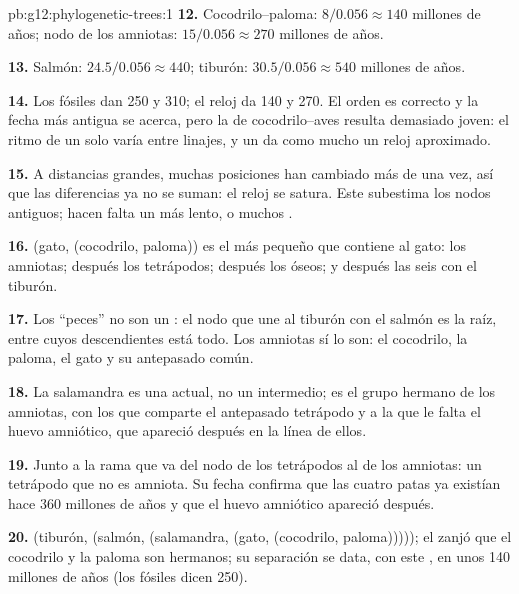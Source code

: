 \begin{solution}{pb:g12:phylogenetic-trees:1}
\textbf{12.} Cocodrilo--paloma: $8/0.056 \approx 140$ millones de años;
nodo de los amniotas: $15/0.056 \approx 270$ millones de años.

\textbf{13.} Salmón: $24.5/0.056 \approx 440$; tiburón:
$30.5/0.056
\approx 540$ millones de años.

\textbf{14.} Los fósiles dan 250 y 310; el reloj da 140 y 270. El orden
es correcto y la fecha más antigua se acerca, pero la de
cocodrilo--aves resulta demasiado joven: el ritmo de un solo  varía
entre linajes, y un  da como mucho un reloj aproximado.

\textbf{15.} A distancias grandes, muchas posiciones han cambiado más
de una vez, así que las diferencias ya no se suman: el reloj se satura.
Este  subestima los nodos antiguos; hacen falta un  más lento, o
muchos .

\textbf{16.} (gato, (cocodrilo, paloma)) es el  más pequeño que
contiene al gato: los amniotas; después los tetrápodos; después los
 óseos; y después las seis con el tiburón.

\textbf{17.} Los ``peces'' no son un : el nodo que une al tiburón
con el salmón es la raíz, entre cuyos descendientes está todo. Los
amniotas sí lo son: el cocodrilo, la paloma, el gato y su antepasado
común.

\textbf{18.} La salamandra es una  actual, no un intermedio; es
el grupo hermano de los amniotas, con los que comparte el antepasado
tetrápodo y a la que le falta el huevo amniótico, que apareció después
en la línea de ellos.

\textbf{19.} Junto a la rama que va del nodo de los tetrápodos al de
los amniotas: un tetrápodo que no es amniota. Su fecha confirma que las
cuatro patas ya existían hace 360 millones de años y que el huevo
amniótico apareció después.

\textbf{20.} (tiburón, (salmón, (salamandra, (gato, (cocodrilo,
paloma))))); el  zanjó que el cocodrilo y la paloma son hermanos; su
separación se data, con este , en unos 140 millones de años (los
fósiles dicen 250).
\end{solution}

